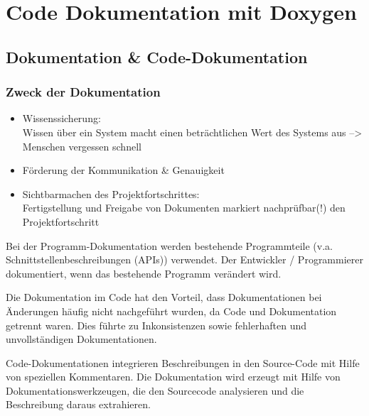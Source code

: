 \chapter{Code Dokumentation mit Doxygen}

\section{Dokumentation \& Code-Dokumentation}

\subsection{Zweck der Dokumentation}

\begin{itemize}
	\item  Wissenssicherung: \\ Wissen über ein System macht einen beträchtlichen Wert des Systems aus --> Menschen vergessen schnell
	\item Förderung der Kommunikation \& Genauigkeit 
	\item Sichtbarmachen des  Projektfortschrittes: \\ Fertigstellung und Freigabe von Dokumenten markiert nachprüfbar(!) den Projektfortschritt
\end{itemize}

Bei der Programm-Dokumentation werden bestehende Programmteile (v.a. Schnittstellenbeschreibungen (APIs)) verwendet. Der Entwickler / Programmierer dokumentiert, wenn das bestehende Programm verändert wird.

Die Dokumentation im Code hat den Vorteil, dass Dokumentationen bei Änderungen häufig nicht nachgeführt wurden, da Code und Dokumentation getrennt waren. Dies führte zu Inkonsistenzen sowie fehlerhaften und unvollständigen Dokumentationen.

Code-Dokumentationen integrieren Beschreibungen in den Source-Code mit Hilfe von speziellen
Kommentaren. Die Dokumentation wird erzeugt mit Hilfe von Dokumentationswerkzeugen, die den Sourcecode analysieren und die Beschreibung daraus extrahieren.

